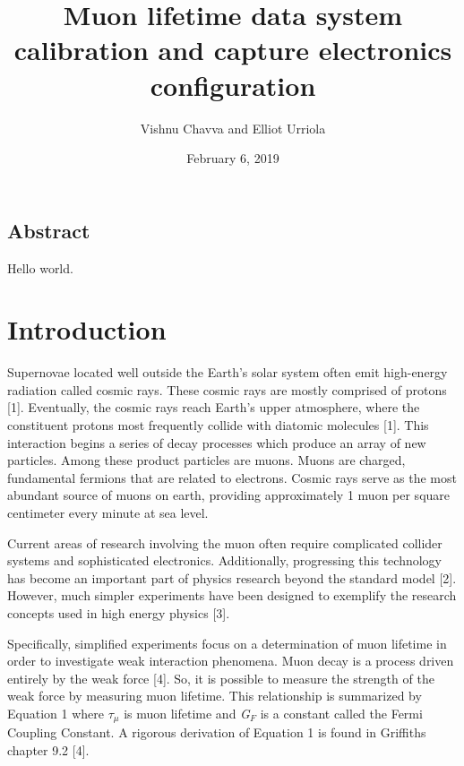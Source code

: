 \documentclass{article}
\title{Muon lifetime data system calibration and capture electronics configuration}
\author{Vishnu Chavva and Elliot Urriola }
\date{February 6, 2019}
\begin{document}
\maketitle

\begin{center}
    \section*{Abstract}
    Hello world.  
\end{center}

\section*{Introduction}

\hspace{3.5mm} Supernovae located well outside the Earth's solar system often emit high-energy radiation called cosmic rays. These cosmic rays are mostly comprised of protons [1]. %
Eventually, the cosmic rays reach Earth's  upper atmosphere, where the constituent protons most frequently collide with diatomic molecules [1]. %
This interaction begins a series of decay processes which produce an array of new particles. Among these product particles are muons. Muons are charged, fundamental fermions that are related to electrons. Cosmic rays serve as the most abundant source of muons on earth, providing approximately 1 muon per square centimeter every minute at sea level.   

Current areas of research involving the muon often require complicated collider systems and sophisticated electronics. Additionally, progressing this technology has become an important part of physics research beyond the standard model [2]. %
However, much simpler experiments have been designed to exemplify the research concepts used in high energy physics [3]. %



Specifically, simplified experiments focus on a determination of muon lifetime in order to investigate weak interaction phenomena. Muon decay is a process driven entirely by the weak force [4]. %
So, it is possible to measure the strength of the weak force by measuring muon lifetime. This relationship is summarized by Equation 1 where $\tau_{\mu}$ is muon lifetime and \textit{G$_{F}$} is a constant called the Fermi Coupling Constant. A rigorous derivation of Equation 1 is found in Griffiths chapter 9.2 [4]. %
\end{document}
